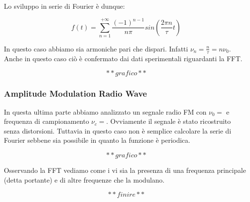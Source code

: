 Lo sviluppo in serie di Fourier è dunque:

\begin{equation}
f(t)=\sum_{n=1}^{+\infty}\frac{(-1)^{n-1}}{n\pi}sin (\frac{2\pi n}{\tau}t)
\end{equation}


In questo caso abbiamo sia armoniche pari che dispari. Infatti $\nu_n=\frac{n}{\tau}=n\nu_0$. Anche in questo caso ciò è confermato dai dati sperimentali riguardanti la FFT. 

$$**grafico**$$

\subsubsection{Amplitude Modulation Radio Wave}

In questa ultima parte abbiamo analizzato un segnale radio FM con $\nu_0=$ e frequenza di campionamento $\nu_c=$. Ovviamente il segnale è stato ricostruito senza distorsioni. Tuttavia in questo caso non è semplice calcolare la serie di Fourier sebbene sia possibile in quanto la funzione è periodica. 

$$**grafico**$$

Osservando la FFT vediamo come i vi sia la presenza di una frequenza principale (detta portante) e di altre frequenze che la modulano. 

$$**finire**$$





